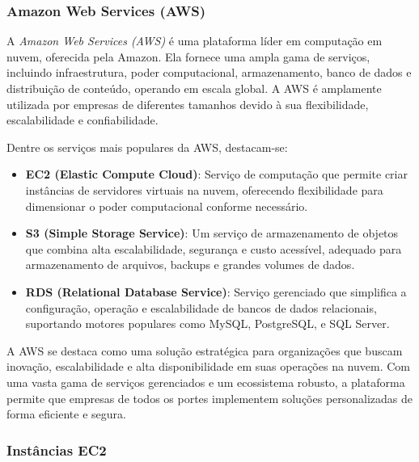 \subsubsection{Amazon Web Services (AWS)}


A \emph{Amazon Web Services (AWS)} é uma plataforma líder em computação em nuvem\cite{cloud-ranking}, oferecida pela Amazon. Ela fornece uma ampla gama de serviços, incluindo infraestrutura, poder computacional, armazenamento, banco de dados e distribuição de conteúdo, operando em escala global. A AWS é amplamente utilizada por empresas de diferentes tamanhos devido à sua flexibilidade, escalabilidade e confiabilidade.

Dentre os serviços mais populares da AWS, destacam-se:

\begin{itemize}
    \item \textbf{EC2 (Elastic Compute Cloud)}: Serviço de computação que permite criar instâncias de servidores virtuais na nuvem, oferecendo flexibilidade para dimensionar o poder computacional conforme necessário.
    \item \textbf{S3 (Simple Storage Service)}: Um serviço de armazenamento de objetos que combina alta escalabilidade, segurança e custo acessível, adequado para armazenamento de arquivos, backups e grandes volumes de dados.
    \item \textbf{RDS (Relational Database Service)}: Serviço gerenciado que simplifica a configuração, operação e escalabilidade de bancos de dados relacionais, suportando motores populares como MySQL, PostgreSQL, e SQL Server.
\end{itemize}

A AWS se destaca como uma solução estratégica para organizações que buscam inovação, escalabilidade e alta disponibilidade em suas operações na nuvem. Com uma vasta gama de serviços gerenciados e um ecossistema robusto, a plataforma permite que empresas de todos os portes implementem soluções personalizadas de forma eficiente e segura.

\subsubsection{Instâncias EC2}


